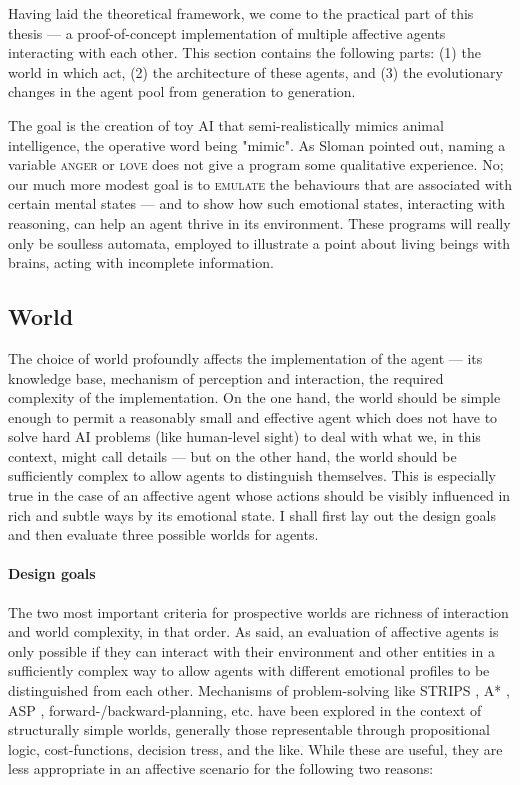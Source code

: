 Having laid the theoretical framework, we come to the practical part of this thesis --- a proof-of-concept implementation of multiple affective agents interacting with each other. This section contains the following parts: (1) the world in which act, (2) the architecture of these agents, and (3) the evolutionary changes in the agent pool from generation to generation.

The goal is the creation of toy AI that semi-realistically mimics animal intelligence, the operative word being "mimic". As Sloman \cite{sloman2000} pointed out, naming a variable \textsc{anger} or \textsc{love} does not give a program some qualitative experience. No; our much more modest goal is to \textsc{emulate} the behaviours that are associated with certain mental states --- and to show how such emotional states, interacting with reasoning, can help an agent thrive in its environment. These programs will really only be soulless automata, employed to illustrate a point about living beings with brains, acting with incomplete information.

\subsection{World}

The choice of world profoundly affects the implementation of the agent --- its knowledge base, mechanism of perception and interaction, the required complexity of the implementation. On the one hand, the world should be simple enough to permit a reasonably small and effective agent which does not have to solve hard AI problems (like human-level sight) to deal with what we, in this context, might call details --- but on the other hand, the world should be sufficiently complex to allow agents to distinguish themselves. This is especially true in the case of an affective agent whose actions should be visibly influenced in rich and subtle ways by its emotional state. I shall first lay out the design goals and then evaluate three possible worlds for agents.

\paragraph{Design goals} The two most important criteria for prospective worlds are richness of interaction and world complexity, in that order. As said, an evaluation of affective agents is only possible if they can interact with their environment and other entities in a sufficiently complex way to allow agents with different emotional profiles to be distinguished from each other. Mechanisms of problem-solving like STRIPS \cite{fikesNilsson}, A* \cite{nilssonAStar}, ASP \cite{lifschitz}, forward-/backward-planning, etc. have been explored in the context of structurally simple worlds, generally those representable through propositional logic, cost-functions, decision tress, and the like. While these are useful, they are less appropriate in an affective scenario for the following two reasons:

